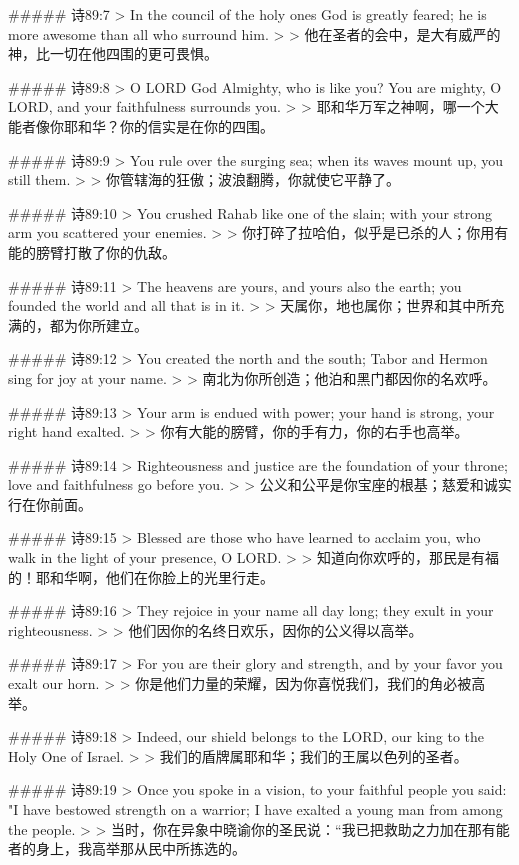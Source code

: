 ##### 诗89:7
> In the council of the holy ones God is greatly feared; he is more awesome than all who surround him.
>
> 他在圣者的会中，是大有威严的　神，比一切在他四围的更可畏惧。


##### 诗89:8
> O LORD God Almighty, who is like you? You are mighty, O LORD, and your faithfulness surrounds you.
>
> 耶和华万军之神啊，哪一个大能者像你耶和华？你的信实是在你的四围。


##### 诗89:9
> You rule over the surging sea; when its waves mount up, you still them.
>
> 你管辖海的狂傲；波浪翻腾，你就使它平静了。


##### 诗89:10
> You crushed Rahab like one of the slain; with your strong arm you scattered your enemies.
>
> 你打碎了拉哈伯，似乎是已杀的人；你用有能的膀臂打散了你的仇敌。


##### 诗89:11
> The heavens are yours, and yours also the earth; you founded the world and all that is in it.
>
> 天属你，地也属你；世界和其中所充满的，都为你所建立。


##### 诗89:12
> You created the north and the south; Tabor and Hermon sing for joy at your name.
>
> 南北为你所创造；他泊和黑门都因你的名欢呼。


##### 诗89:13
> Your arm is endued with power; your hand is strong, your right hand exalted.
>
> 你有大能的膀臂，你的手有力，你的右手也高举。


##### 诗89:14
> Righteousness and justice are the foundation of your throne; love and faithfulness go before you.
>
> 公义和公平是你宝座的根基；慈爱和诚实行在你前面。


##### 诗89:15
> Blessed are those who have learned to acclaim you, who walk in the light of your presence, O LORD.
>
> 知道向你欢呼的，那民是有福的！耶和华啊，他们在你脸上的光里行走。


##### 诗89:16
> They rejoice in your name all day long; they exult in your righteousness.
>
> 他们因你的名终日欢乐，因你的公义得以高举。


##### 诗89:17
> For you are their glory and strength, and by your favor you exalt our horn.
>
> 你是他们力量的荣耀，因为你喜悦我们，我们的角必被高举。


##### 诗89:18
> Indeed, our shield belongs to the LORD, our king to the Holy One of Israel.
>
> 我们的盾牌属耶和华；我们的王属以色列的圣者。


##### 诗89:19
> Once you spoke in a vision, to your faithful people you said: "I have bestowed strength on a warrior; I have exalted a young man from among the people.
>
> 当时，你在异象中晓谕你的圣民说：“我已把救助之力加在那有能者的身上，我高举那从民中所拣选的。


